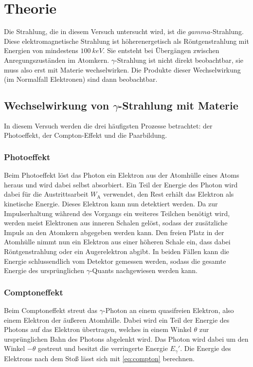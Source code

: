 \section{Theorie}
Die Strahlung, die in diesem Versuch untersucht wird, ist die $gamma$-Strahlung. Diese elektromagnetische Strahlung ist höherenergetisch als Röntgenstrahlung mit Energien von mindestens $\SI{100}{keV}$. Sie entsteht bei Übergängen zwischen Anregungszuständen im Atomkern. $\gamma$-Strahlung ist nicht direkt beobachtbar, sie muss also erst mit Materie wechselwirken. Die Produkte dieser Wechselwirkung (im Normalfall Elektronen) sind dann beobachtbar.
\subsection{Wechselwirkung von $\gamma$-Strahlung mit Materie}
In diesem Versuch werden die drei häufigsten Prozesse betrachtet: der Photoeffekt, der Compton-Effekt und die Paarbildung.
\subsubsection{Photoeffekt}
Beim Photoeffekt löst das Photon ein Elektron aus der Atomhülle eines Atoms heraus und wird dabei selbst absorbiert. Ein Teil der Energie des Photon wird dabei für die Austrittsarbeit $W_\text{A}$ verwendet, den Rest erhält das Elektron als kinetische Energie. Dieses Elektron kann nun detektiert werden. Da zur Impulserhaltung während des Vorgangs ein weiteres Teilchen benötigt wird, werden meist Elektronen aus inneren Schalen gelöst, sodass der zusätzliche Impuls an den Atomkern abgegeben werden kann. Den freien Platz in der Atomhülle nimmt nun ein Elektron aus einer höheren Schale ein, dass dabei Röntgenstrahlung oder ein Augerelektron abgibt. In beiden Fällen kann die Energie schlussendlich vom Detektor gemessen werden, sodass die gesamte Energie des ursprünglichen $\gamma$-Quants nachgewiesen werden kann.

\subsubsection{Comptoneffekt}
Beim Comptoneffekt streut das $\gamma$-Photon an einem quasifreien Elektron, also einem Elektron der äußeren Atomhülle. Dabei wird ein Teil der Energie des Photons auf das Elektron übertragen, welches in einem Winkel $\theta$ zur ursprünglichen Bahn des Photons abgelenkt wird. Das Photon wird dabei um den Winkel $-\theta$ gestreut und besitzt die verringerte Energie $E_\gamma'$. Die Energie des Elektrons nach dem Stoß lässt sich mit \cref{eq:compton} berechnen.

